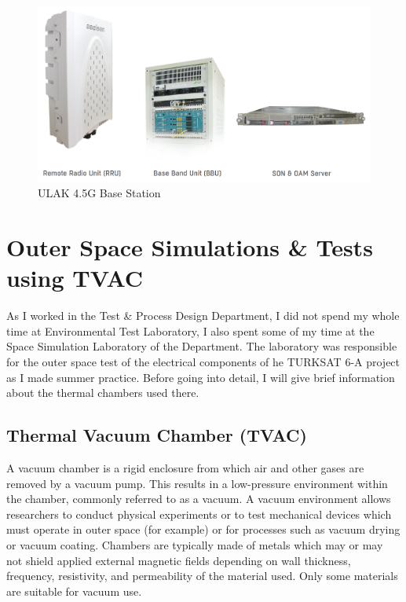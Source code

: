\begin{figure}[H]
	\center
	\setlength{\unitlength}{\textwidth} 
	\includegraphics[width=0.8\unitlength]{ulak}
	\caption{\label{fig:ulak}ULAK 4.5G Base Station\cite{ulak} }
\end{figure}	
	
	
\newpage

\section{Outer Space Simulations \& Tests using TVAC  }
\- \indent
	As I worked in the Test \& Process Design Department, I did not spend my whole time at Environmental Test Laboratory, I also spent some of my time at the Space Simulation Laboratory of the Department. The laboratory was responsible for the outer space test of the electrical components of he TURKSAT 6-A project as I made summer practice. Before going into detail, I will give brief information about the thermal chambers used there.
	
\subsection{Thermal Vacuum Chamber (TVAC) }
\- \indent
	A vacuum chamber is a rigid enclosure from which air and other gases are removed by a vacuum pump. This results in a low-pressure environment within the chamber, commonly referred to as a vacuum. A vacuum environment allows researchers to conduct physical experiments or to test mechanical devices which must operate in outer space (for example) or for processes such as vacuum drying or vacuum coating. Chambers are typically made of metals which may or may not shield applied external magnetic fields depending on wall thickness, frequency, resistivity, and permeability of the material used. Only some materials are suitable for vacuum use\cite{tvac}.\\


